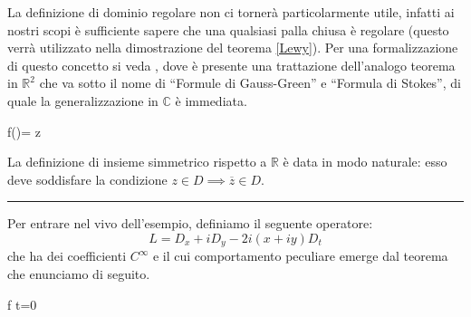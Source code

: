 \begin{remark}
La definizione di dominio regolare non ci tornerà particolarmente utile, infatti ai nostri scopi è sufficiente sapere che una qualsiasi palla chiusa è regolare (questo verrà utilizzato nella dimostrazione del teorema \ref{Lewy}). Per una formalizzazione di questo concetto si veda \cite[cap.8]{FMS}, dove è presente una trattazione dell'analogo teorema in $\mathbb{R}^2$ che va sotto il nome di ``Formule di Gauss-Green'' e ``Formula di Stokes'', di quale la generalizzazione in $\mathbb{C}$ è immediata.
\end{remark}

\begin{namedtheorem}
{f()= \quad \forall z \in {}}
\end{namedtheorem}

\begin{remark}
La definizione di insieme simmetrico rispetto a $\mathbb{R}$ è data in modo naturale: esso deve soddisfare la condizione $z \in D \implies \overline{z} \in D$.
\end{remark}

\noindent\rule[0.5ex]{\linewidth}{0.2pt}

Per entrare nel vivo dell'esempio, definiamo il seguente operatore:
$$L=D_x+iD_y-2i(x+iy)D_t$$
che ha dei coefficienti $C^\infty$ e il cui comportamento peculiare emerge dal teorema che enunciamo di seguito.

\begin{theorem}\label{Lewy}
{f  t=0}
\end{theorem}

